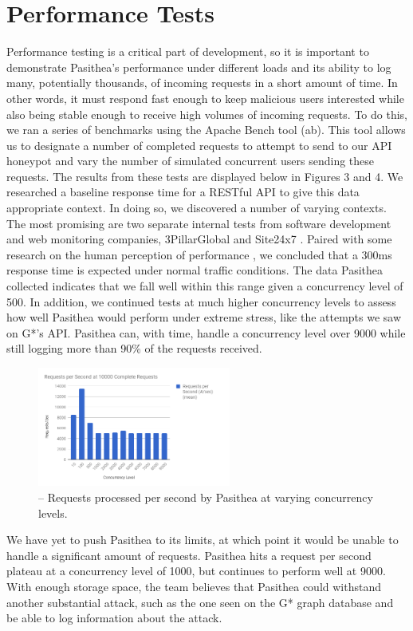 \documentclass[10pt, conference]{IEEEtran}
\begin{document}
\section{Performance Tests}
\label{performance}
Performance testing is a critical part of development, so it is important to demonstrate Pasithea’s performance under different loads and its ability to log many, potentially thousands, of incoming requests in a short amount of time. In other words, it must respond fast enough to keep malicious users interested while also being stable enough to receive high volumes of incoming requests. To do this, we ran a series of benchmarks using the Apache Bench \cite{ab} tool (ab). This tool allows us to designate a number of completed requests to attempt to send to our API honeypot and vary the number of simulated concurrent users sending these requests. The results from these tests are displayed below in Figures 3 and 4. We researched a baseline response time for a RESTful API to give this data appropriate context. In doing so, we discovered a number of varying contexts. The most promising are two separate internal tests from software development and web monitoring companies, 3PillarGlobal \cite{3Pillar} and Site24x7 \cite{site24x7}. Paired with some research on the human perception of performance \cite{performance}, we concluded that a 300ms response time is expected under normal traffic conditions. The data Pasithea collected indicates that we fall well within this range given a concurrency level of 500. In addition, we continued tests at much higher concurrency levels to assess how well Pasithea would perform under extreme stress, like the attempts we saw on G*’s API. Pasithea can, with time, handle a concurrency level over 9000 while still logging more than 90\% of the requests received.

\begin{figure}[h]
\centering
\includegraphics[width=2.5in]{images/RequestsperSecond.png} 
\caption{-- Requests processed per second by Pasithea at varying concurrency levels.}
\end{figure}

We have yet to push Pasithea to its limits, at which point it would be unable to handle a significant amount of requests. Pasithea hits a  request per second plateau at a concurrency level of 1000, but continues to perform well at 9000. With enough storage space, the team believes that Pasithea could withstand another substantial attack, such as the one seen on the G* graph database and be able to log information about the attack.
\end{document}
